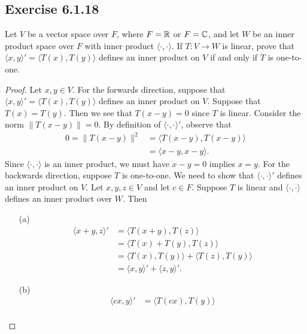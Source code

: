 \subsection*{Exercise 6.1.18} Let \( V  \) be a vector space over \( F  \), where \( F = \mathbb{R}  \) or \( F = \mathbb{C}  \), and let \( W  \) be an inner product space over \( F  \) with inner product \( \langle \cdot  ,  \cdot  \rangle \). If \( T: V \to W  \) is linear, prove that \( \langle x , y \rangle' = \langle T(x)  , T(y) \rangle \) defines an inner product on \( V  \) if and only if \( T  \) is one-to-one.
\begin{proof}
    Let \( x,y \in V  \). For the forwards direction, suppose that \( \langle x , y \rangle' = \langle  T(x)  , T(y) \rangle \) defines an inner product on \( V  \). Suppose that \( T(x) = T(y) \). Then we see that \( T(x-y) = 0   \) since \( T  \) is linear. Consider the norm \( \|T(x-y)\| = 0  \). By definition of \( \langle \cdot , \cdot \rangle'  \), observe that
    \begin{align*}
        0 = \|T(x-y)\|^{2} &= \langle T(x-y) , T(x-y)  \rangle \\
                       &= \langle x -y  , x - y  \rangle.
    \end{align*}
    Since \( \langle \cdot , \cdot \rangle \) is an inner product, we must have \( x - y = 0  \) implies \( x = y  \).
For the backwards direction, suppose \( T  \) is one-to-one. We need to show that \( \langle \cdot , \cdot \rangle' \) defines an inner product on \( V  \). Let \( x,y,z \in V  \) and let \( c \in F  \). Suppose \( T  \) is linear and \( \langle \cdot ,  \cdot  \rangle  \) defines an inner product over \( W  \). Then
\begin{enumerate}
    \item[(a)] 
        \begin{align*}
            \langle x + y  ,  z  \rangle' &= \langle  T(x+y)  , T(z) \rangle \\
                                          &=  \langle T(x) + T(y)  , T(z) \rangle \\
                                          &= \langle T(x)  , T(y) \rangle + \langle T(z)  , T(y)   \rangle \\
                                          &=  \langle x , y \rangle' + \langle z , y \rangle'.
        \end{align*}
    \item[(b)] 
        \begin{align*}
            \langle cx , y \rangle' &= \langle  T(cx)  , T(y) \rangle  \\

\end{align*}
\end{enumerate}
\end{proof}
